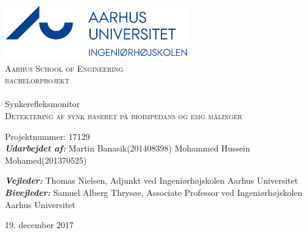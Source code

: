 
\begin{titlingpage}
\begin{center}

~ \\[3cm]

\includegraphics[width=0.6\textwidth]{figure/AU}~\\[1cm]

\textsc{\LARGE Aarhus School of Engineering}\\[1.5cm]

\textsc{\Large bachelorprojekt}\\

\noindent\makebox[\linewidth]{\rule{\textwidth}{0.4pt}}\\
[0.5cm]{\Huge Synkerefleksmonitor}\\
\textsc{Detektering af synk baseret på bioimpedans og emg målinger}
\noindent\makebox[\linewidth]{\rule{\textwidth}{0.4pt}}

\end{center}


Projektnummer: 17129 \newline\\
\textbf{\textit{Udarbejdet af:}} \newline
Martin Banasik\tab(201408398) \newline	
Mohammed Hussein Mohamed\tab(201370525) \newline	





\textbf{\textit{Vejleder:}} \newline
Thomas Nielsen, Adjunkt ved Ingeniørhøjskolen Aarhus Universitet\\
\textbf{\textit{Bivejleder:}} \newline
Samuel Alberg Thrysøe, Associate Professor ved Ingeniørhøjskolen Aarhus Universitet\\


\vfill

\begin{center}
{\large 19. december 2017}
\end{center}


\end{titlingpage}